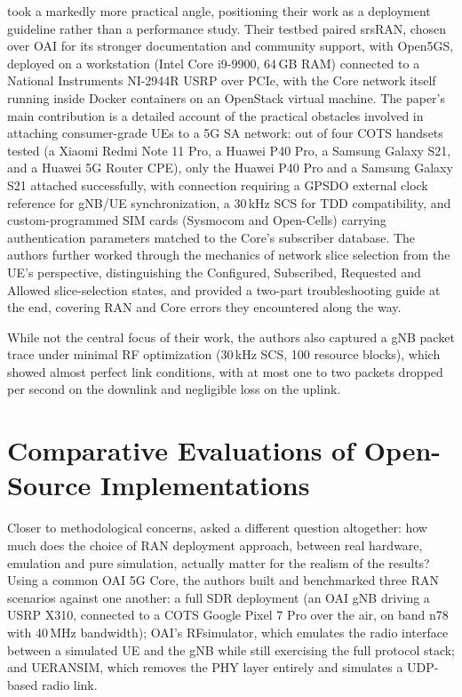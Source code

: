 \textcite{mamushiane2023deploying} took a markedly more practical angle, positioning their work as a deployment guideline rather than a performance study. Their testbed paired srsRAN, chosen over \gls{OAI} for its stronger documentation and community support, with Open5GS, deployed on a workstation (Intel Core i9-9900, 64\,GB RAM) connected to a National Instruments NI-2944R USRP over PCIe, with the Core network itself running inside Docker containers on an OpenStack virtual machine. The paper's main contribution is a detailed account of the practical obstacles involved in attaching consumer-grade \glspl{UE} to a 5G \gls{SA} network: out of four \gls{COTS} handsets tested (a Xiaomi Redmi Note 11 Pro, a Huawei P40 Pro, a Samsung Galaxy S21, and a Huawei 5G Router CPE), only the Huawei P40 Pro and a Samsung Galaxy S21 attached successfully, with connection requiring a \gls{GPSDO} external clock reference for \gls{gNB}/\gls{UE} synchronization, a 30\,kHz \gls{SCS} for \gls{TDD} compatibility, and custom-programmed SIM cards (Sysmocom and Open-Cells) carrying authentication parameters matched to the Core's subscriber database. The authors further worked through the mechanics of network slice selection from the \gls{UE}'s perspective, distinguishing the Configured, Subscribed, Requested and Allowed slice-selection states, and provided a two-part troubleshooting guide at the end, covering \gls{RAN} and Core errors they encountered along the way.

While not the central focus of their work, the authors also captured a \gls{gNB} packet trace under minimal \gls{RF} optimization (30\,kHz \gls{SCS}, 100 resource blocks), which showed almost perfect link conditions, with at most one to two packets dropped per second on the downlink and negligible loss on the uplink.

\section{Comparative Evaluations of Open-Source Implementations}
\label{sec:related_comparative}

Closer to methodological concerns, \textcite{rouili2024evaluating} asked a different question altogether: how much does the choice of \gls{RAN} deployment approach, between real hardware, emulation and pure simulation, actually matter for the realism of the results? Using a common \gls{OAI} 5G Core, the authors built and benchmarked three \gls{RAN} scenarios against one another: a full \gls{SDR} deployment (an \gls{OAI} \gls{gNB} driving a USRP X310, connected to a \gls{COTS} Google Pixel 7 Pro over the air, on band n78 with 40\,MHz bandwidth); \gls{OAI}'s RFsimulator, which emulates the radio interface between a simulated \gls{UE} and the \gls{gNB} while still exercising the full protocol stack; and UERANSIM, which removes the \gls{PHY} layer entirely and simulates a UDP-based radio link.

